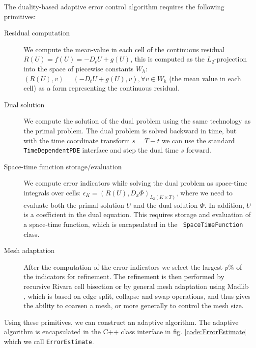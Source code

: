 The duality-based adaptive error control algorithm requires the
following primitives:

\begin{description}
\item[Residual computation]
We compute the mean-value in each cell of the continuous residual
$R(U) = f(U) = -D_t U + g(U)$, this is computed as the
$L_2$-projection into the space of piecewise constants $W_h$: $(R(U),
v) = (-D_t U + g(U), v), \forall v \in W_h$ (the mean value in each
cell) as a form representing the continuous residual.
\item[Dual solution]
We compute the solution of the dual problem using the same technology
as the primal problem. The dual problem is solved backward in time,
but with the time coordinate transform $s = T - t$ we can use the
standard {\tt TimeDependentPDE} interface and step the dual time $s$
forward.
\item[Space-time function storage/evaluation]
We compute error indicators while solving the dual problem as
space-time integrals over cells: $\epsilon_K = (R(U),
D_x \Phi)_{L_2(K \times T)}$, where we need to evaluate both the
primal solution $U$ and the dual solution $\Phi$. In addition, $U$ is
a coefficient in the dual equation. This requires storage and
evaluation of a space-time function, which is encapsulated in the {\tt
SpaceTimeFunction} class.
\item[Mesh adaptation]
After the computation of the error indicators we select the largest
$p\%$ of the indicators for refinement. The refinement is then
performed by recursive Rivara cell bisection or by general mesh
adaptation using Madlib \cite{CompereHoffmanEtAl2009}, which is
based on edge split, collapse and swap operations, and thus gives
the ability to coarsen a mesh, or more generally to control the mesh
size.
\end{description}

Using these primitives, we can construct an adaptive algorithm. The
adaptive algorithm is encapsulated in the C++ class interface in
fig. \ref{code:ErrorEstimate} which we call {\tt ErrorEstimate}.

